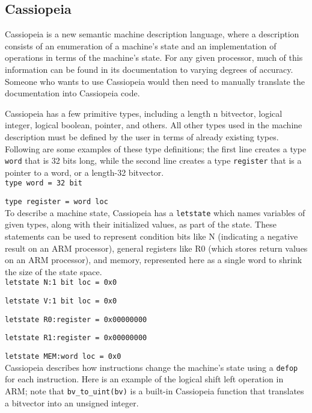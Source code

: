\documentclass[letterpaper,12pt]{article}
\begin{document}
\subsection{Cassiopeia}

Cassiopeia is a new semantic machine description language, where a description consists of an enumeration of a machine's state and an implementation of operations in terms of the machine's state. For any given processor, much of this information can be found in its documentation to varying degrees of accuracy. Someone who wants to use Cassiopeia would then need to manually translate the documentation into Cassiopeia code.

Cassiopeia has a few primitive types, including a length n bitvector, logical integer, logical boolean, pointer, and others. All other types used in the machine description must be defined by the user in terms of already existing types. Following are some examples of these type definitions; the first line creates a type \texttt{word} that is 32 bits long, while the second line creates a type \texttt{register} that is a pointer to a word, or a length-32 bitvector.\\

\texttt{type word = 32 bit}

\texttt{type register = word loc}\\

To describe a machine state, Cassiopeia has a \texttt{letstate} which names variables of given types, along with their initialized values, as part of the state. These statements can be used to represent condition bits like N (indicating a negative result on an ARM processor), general registers like R0 (which stores return values on an ARM processor), and memory, represented here as a single word to shrink the size of the state space.\\

\texttt{letstate N:1 bit loc = 0x0}

\texttt{letstate V:1 bit loc = 0x0}

\texttt{letstate R0:register = 0x00000000}

\texttt{letstate R1:register = 0x00000000}

\texttt{letstate MEM:word loc = 0x0}\\

Cassiopeia describes how instructions change the machine's state using a \texttt{defop} for each instruction.  Here is an example of the logical shift left operation in ARM; note that \texttt{bv\_to\_uint(bv)} is a built-in Cassiopeia function that translates a bitvector into an unsigned integer.\\
        
\end{document}
